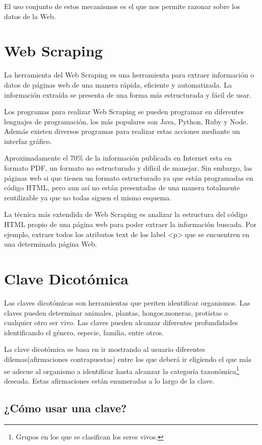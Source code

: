El uso conjunto de estos mecanismos es el que nos permite razonar sobre los datos de la Web.

\section{Web Scraping}

La herramienta del Web Scraping es una herramienta para extraer información o datos de páginas web de una manera rápida, eficiente y automatizada. La información extraída se presenta de una forma más estructurada y fácil de usar.\cite{webScraping}

Los programas para realizar Web Scraping se pueden programar en diferentes lenguajes de programación, los más populares son Java, Python, Ruby y Node. Además existen diversos programas para realizar estas acciones mediante un interfaz gráfico.

Aproximadamente el 70\% de la información publicada en Internet esta en formato PDF, un formato no estructurado y difícil de manejar. Sin embargo, las páginas web si que tienen un formato estructurado ya que están programadas en código HTML, pero aun así no están presentadas de una manera totalmente reutilizable ya que no todas siguen el mismo esquema.

La técnica más extendida de Web Scraping es analizar la estructura del código HTML propio de una página web para poder extraer la información buscada. Por ejemplo, extraer todos los atributos text de los label <p> que se encuentren en una determinada página Web.


\section{Clave Dicotómica}

Las claves dicotómicas son herramientas que periten identificar organismos. Las claves pueden determinar animales, plantas, hongos,moneras, protistas o cualquier otro ser vivo. Las claves pueden alcanzar diferentes profundidades identificando el género, especie, familia, entre otros.

La clave dicotómica se basa en ir mostrando al usuario diferentes dilemas(afirmaciones contrapuestas) entre los que deberá ir eligiendo el que más se adecue al organismo a identificar hasta alcanzar la categoría taxonómica\footnote{Grupos en los que se clasifican los seres vivos.} deseada. Estas afirmaciones están enumeradas a lo largo de la clave.

\subsection{¿Cómo usar una clave?}

